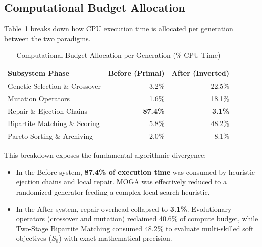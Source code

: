 \documentclass[10pt,journal,compsoc]{IEEEtran}
\begin{document}
\subsection{Computational Budget Allocation}
Table~\ref{tab:computational_budget} breaks down how CPU execution time is allocated per generation between the two paradigms.

\begin{table}[h]
\centering
\caption{Computational Budget Allocation per Generation (\% CPU Time)}
\label{tab:computational_budget}
\footnotesize
\setlength{\tabcolsep}{2.5pt}
\begin{tabular}{lrr}
\toprule
\textbf{Subsystem Phase} & \textbf{Before (Primal)} & \textbf{After (Inverted)} \\
\midrule
Genetic Selection \& Crossover     & 3.2\%  & 22.5\% \\
Mutation Operators                 & 1.6\%  & 18.1\% \\
Repair \& Ejection Chains          & \textbf{87.4\%} & \textbf{3.1\%} \\
Bipartite Matching \& Scoring      & 5.8\%  & 48.2\% \\
Pareto Sorting \& Archiving        & 2.0\%  & 8.1\% \\
\bottomrule
\end{tabular}
\end{table}

This breakdown exposes the fundamental algorithmic divergence:
\begin{itemize}
    \item In the Before system, \textbf{87.4\% of execution time} was consumed by heuristic ejection chains and local repair. MOGA was effectively reduced to a randomized generator feeding a complex local search heuristic.
    \item In the After system, repair overhead collapsed to \textbf{3.1\%}. Evolutionary operators (crossover and mutation) reclaimed 40.6\% of compute budget, while Two-Stage Bipartite Matching consumed 48.2\% to evaluate multi-skilled soft objectives ($S_8$) with exact mathematical precision.
\end{itemize}
\end{document}
